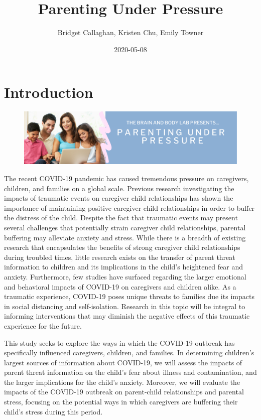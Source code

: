 \documentclass[]{book}
\title{Parenting Under Pressure}
\author{Bridget Callaghan, Kristen Chu, Emily Towner}
\date{2020-05-08}
\begin{document}
\maketitle

{
\setcounter{tocdepth}{1}
\tableofcontents
}
\hypertarget{introduction}{%
\chapter{Introduction}\label{introduction}}

\begin{figure}
\centering
\includegraphics{images/PUP_header.png}
\caption{}
\end{figure}

The recent COVID-19 pandemic has caused tremendous pressure on caregivers, children, and families on a global scale. Previous research investigating the impacts of traumatic events on caregiver child relationships has shown the importance of maintaining positive caregiver child relationships in order to buffer the distress of the child. Despite the fact that traumatic events may present several challenges that potentially strain caregiver child relationships, parental buffering may alleviate anxiety and stress. While there is a breadth of existing research that encapsulates the benefits of strong caregiver child relationships during troubled times, little research exists on the transfer of parent threat information to children and its implications in the child's heightened fear and anxiety. Furthermore, few studies have surfaced regarding the larger emotional and behavioral impacts of COVID-19 on caregivers and children alike. As a traumatic experience, COVID-19 poses unique threats to families due its impacts in social distancing and self-isolation. Research in this topic will be integral to informing interventions that may diminish the negative effects of this traumatic experience for the future.

This study seeks to explore the ways in which the COVID-19 outbreak has specifically influenced caregivers, children, and families. In determining children's largest sources of information about COVID-19, we will assess the impacts of parent threat information on the child's fear about illness and contamination, and the larger implications for the child's anxiety. Moreover, we will evaluate the impacts of the COVID-19 outbreak on parent-child relationships and parental stress, focusing on the potential ways in which caregivers are buffering their child's stress during this period.
\end{document}
